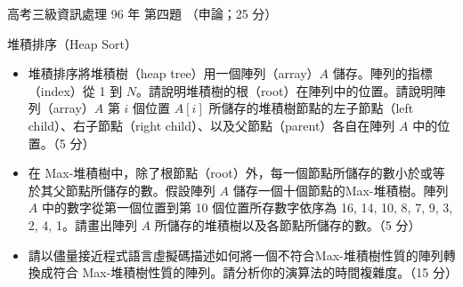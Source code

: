 \begin{pastexam}[label={px:gk3-096-ds-04}]{高考三級資訊處理 96 年 第四題}
（申論；25 分）

堆積排序（Heap Sort）
\begin{itemize}[leftmargin=2.2em]
\item[㈠] 堆積排序將堆積樹（heap tree）用一個陣列（array）$A$ 儲存。陣列的指標（index）從 1 到 $N$。請說明堆積樹的根（root）在陣列中的位置。請說明陣列（array）$A$ 第 $i$ 個位置 $A[i]$ 所儲存的堆積樹節點的左子節點（left child）、右子節點（right child）、以及父節點（parent）各自在陣列 $A$ 中的位置。（5 分）
\item[㈡] 在 Max-堆積樹中，除了根節點（root）外，每一個節點所儲存的數小於或等於其父節點所儲存的數。假設陣列 $A$ 儲存一個十個節點的Max-堆積樹。陣列 $A$ 中的數字從第一個位置到第 10 個位置所存數字依序為 16, 14, 10, 8, 7, 9, 3, 2, 4, 1。請畫出陣列 $A$ 所儲存的堆積樹以及各節點所儲存的數。（5 分）
\item[㈢] 請以儘量接近程式語言虛擬碼描述如何將一個不符合Max-堆積樹性質的陣列轉換成符合 Max-堆積樹性質的陣列。請分析你的演算法的時間複雜度。（15 分）
\end{itemize}
\end{pastexam}

